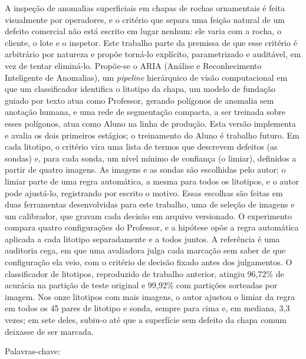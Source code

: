 \begin{resumo}
  \vspace{-15pt}

  A inspeção de anomalias superficiais em chapas de rochas ornamentais é feita visualmente por operadores, e o critério que separa uma feição natural de um defeito comercial não está escrito em lugar nenhum: ele varia com a rocha, o cliente, o lote e o inspetor. Este trabalho parte da premissa de que esse critério é arbitrário por natureza e propõe torná-lo explícito, parametrizado e auditável, em vez de tentar eliminá-lo. Propõe-se o ARIA (Análise e Reconhecimento Inteligente de Anomalias), um \textit{pipeline} hierárquico de visão computacional em que um classificador identifica o litotipo da chapa, um modelo de fundação guiado por texto atua como Professor, gerando polígonos de anomalia sem anotação humana, e uma rede de segmentação compacta, a ser treinada sobre esses polígonos, atua como Aluno na linha de produção. Esta versão implementa e avalia os dois primeiros estágios; o treinamento do Aluno é trabalho futuro. Em cada litotipo, o critério vira uma lista de termos que descrevem defeitos (as sondas) e, para cada sonda, um nível mínimo de confiança (o limiar), definidos a partir de quatro imagens. As imagens e as sondas são escolhidas pelo autor; o limiar parte de uma regra automática, a mesma para todos os litotipos, e o autor pode ajustá-lo, registrando por escrito o motivo. Essas escolhas são feitas em duas ferramentas desenvolvidas para este trabalho, uma de seleção de imagens e um calibrador, que gravam cada decisão em arquivo versionado. O experimento compara quatro configurações do Professor, e a hipótese opõe a regra automática aplicada a cada litotipo separadamente e a todos juntos. A referência é uma auditoria cega, em que uma avaliadora julga cada marcação sem saber de que configuração ela veio, com o critério de decisão fixado antes dos julgamentos. O classificador de litotipos, reproduzido de trabalho anterior, atingiu 96,72\% de acurácia na partição de teste original e 99,92\% com partições sorteadas por imagem. Nos onze litotipos com mais imagens, o autor ajustou o limiar da regra em todos os 45 pares de litotipo e sonda, sempre para cima e, em mediana, 3,3 vezes; em sete deles, subiu-o até que a superfície sem defeito da chapa comum deixasse de ser marcada.

  Palavras-chave: \palavraschaveemlinha
\end{resumo}


